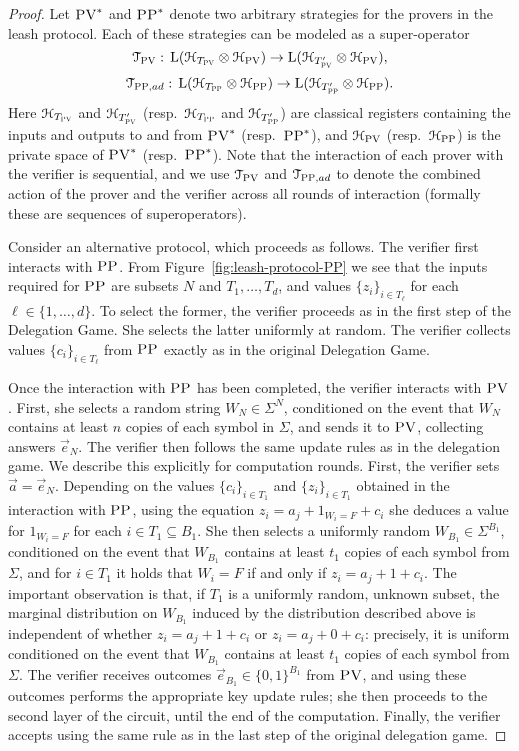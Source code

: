 \begin{proof}
Let $\textsc{PV}^*$ and $\textsc{PP}^*$ denote two arbitrary strategies for the provers in the leash protocol. Each of these strategies can be modeled as a super-operator 
$$\mathcal{T}_{\textsc{PV}}:\, \mathrm{L}(\mathcal{H}_{T_{\textsc{PV}}} \otimes \mathcal{H}_{\textsc{PV}}) \to \mathrm{L}(\mathcal{H}_{T'_{\textsc{PV}}} \otimes \mathcal{H}_{\textsc{PV}}),$$
$$\mathcal{T}_{\textsc{PP},ad}: \,\mathrm{L}(\mathcal{H}_{T_{\textsc{PP}}} \otimes \mathcal{H}_{\textsc{PP}}) \to \mathrm{L}(\mathcal{H}_{T'_{\textsc{PP}}} \otimes \mathcal{H}_{\textsc{PP}}).$$
Here $\mathcal{H}_{T_{\textsc{PV}}}$ and $\mathcal{H}_{T'_{\textsc{PV}}}$ (resp.\ $\mathcal{H}_{T_{\textsc{PP}}}$ and $\mathcal{H}_{T'_{\textsc{PP}}}$) are classical registers containing the inputs and outputs to and from $\textsc{PV}^*$ (resp.\ $\textsc{PP}^*$), and $\mathcal{H}_{\textsc{PV}}$ (resp.\ $\mathcal{H}_{\textsc{PP}}$) is the private space of $\textsc{PV}^*$ (resp.\ $\textsc{PP}^*$). Note that the interaction of each prover with the verifier is sequential, and we use $\mathcal{T}_{\textsc{PV}}$ and $\mathcal{T}_{\textsc{PP},ad}$ to denote the combined action of the prover and the verifier across all rounds of interaction (formally these are sequences of superoperators).

Consider an alternative protocol, which proceeds as follows. The verifier first interacts with $\textsc{PP}$. From Figure~\ref{fig:leash-protocol-PP} we see that the inputs required for $\textsc{PP}$ are subsets $N$ and $T_1,\ldots,T_d$, and values $\{z_i\}_{i\in T_\ell}$ for each $\ell\in\{1,\ldots,d\}$. To select the former, the verifier proceeds as in the first step of the Delegation Game. She selects the latter uniformly at random. The verifier collects values $\{c_i\}_{i\in T_\ell}$ from $\textsc{PP}$ exactly as in the original Delegation Game. 

Once the interaction with $\textsc{PP}$ has been completed, the verifier interacts with $\textsc{PV}$. First, she selects a random string $W_N\in \Sigma^N$, conditioned on the event that $W_N$ contains at least $n$ copies of each symbol in $\Sigma$, and sends it to $\textsc{PV}$, collecting answers $\vec{e}_N$. The verifier then follows the same update rules as in the delegation game. We describe this explicitly for computation rounds. First, the verifier sets $\vec{a} = \vec{e}_N$. Depending on the values $\{c_i\}_{i\in T_1}$ and $\{z_i\}_{i\in T_1}$ obtained in the interaction with $\textsc{PP}$, using the equation $z_i = a_j + 1_{W_i=F}+c_i$ she deduces a value for $1_{W_i=F}$ for each $i\in T_1 \subseteq B_1$. She then selects a uniformly random $W_{B_1} \in \Sigma^{B_1}$, conditioned on the event that $W_{B_1}$ contains at least $t_1$ copies of each symbol from $\Sigma$, and for $i\in T_1$ it holds that $W_i=F$ if and only if $z_i = a_j + 1+c_i$. The important observation is that, if $T_1$ is a uniformly random, unknown subset, the marginal distribution on $W_{B_1}$ induced by the distribution described above is independent of whether $z_i = a_j + 1+c_i$ or $z_i = a_j + 0 +c_i$: precisely, it is uniform conditioned on the event that $W_{B_1}$ contains at least $t_1$ copies of each symbol from $\Sigma$. 
The verifier receives outcomes $\vec{e}_{B_1}\in \{0,1\}^{B_1}$ from $\textsc{PV}$, and using these outcomes performs the appropriate key update rules; she then proceeds to the second layer of the circuit, until the end of the computation. Finally, the verifier accepts using the same rule as in the last step of the original delegation game. 


\end{proof}
